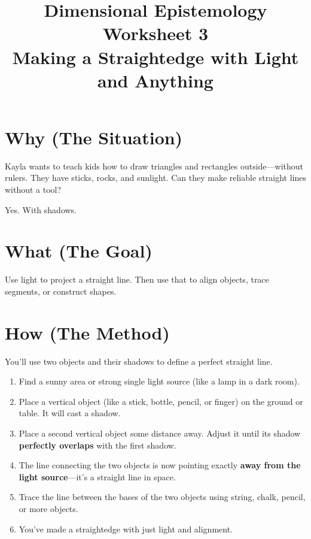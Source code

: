 \documentclass[11pt]{article}
\title{\vspace{-2cm}Dimensional Epistemology Worksheet 3\\
\Large{Making a Straightedge with Light and Anything}}
\date{}
\author{}
\begin{document}
\maketitle

\section*{Why (The Situation)}

Kayla wants to teach kids how to draw triangles and rectangles outside—without rulers. They have sticks, rocks, and sunlight. Can they make reliable straight lines without a tool?

Yes. With shadows.

\section*{What (The Goal)}

Use light to project a straight line. Then use that to align objects, trace segments, or construct shapes.

\section*{How (The Method)}

You’ll use two objects and their shadows to define a perfect straight line.

\begin{enumerate}[leftmargin=*, label=\textbf{Step \arabic*.}]
    \item Find a sunny area or strong single light source (like a lamp in a dark room).

    \item Place a vertical object (like a stick, bottle, pencil, or finger) on the ground or table. It will cast a shadow.

    \item Place a second vertical object some distance away. Adjust it until its shadow \textbf{perfectly overlaps} with the first shadow.

    \item The line connecting the two objects is now pointing exactly \textbf{away from the light source}—it’s a straight line in space.

    \item Trace the line between the bases of the two objects using string, chalk, pencil, or more objects.

    \item You’ve made a straightedge with just light and alignment.
\end{enumerate}
\end{document}
